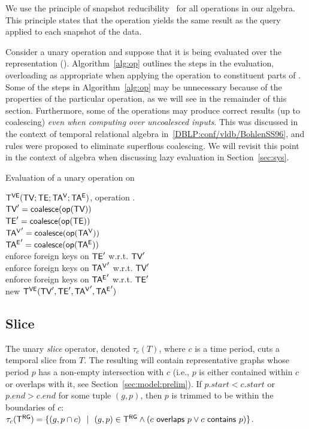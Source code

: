 We use the principle of snapshot
reducibility~\cite{DBLP:reference/db/Bohlen092} for all operations in
our algebra.  This principle states that the operation yields the same
result as the query applied to each snapshot of the data.

Consider a unary operation \op and suppose that it is being evaluated
over the \ve representation \op(\tve).  Algorithm~\ref{alg:op}
outlines the steps in the evaluation, overloading \opp as appropriate
when applying the operation to constituent parts of \tve.  Some of the
steps in Algorithm~\ref{alg:op} may be unnecessary because of the
properties of the particular operation, as we will see in the
remainder of this section.  Furthermore, some of the operations may
produce correct results (up to coalescing) {\em even when computing
  over uncoalesced inputs}.  This was discussed in the context of
temporal relational algebra in~\ref{DBLP:conf/vldb/BohlenSS96}, and
rules were proposed to eliminate superflous coalescing. We will
revisit this point in the context of \tg algebra when discussing lazy
evaluation in Section~\ref{sec:sys}.

\begin{algorithm}[h!]
\caption{Evaluation of a unary operation on \tve}
\begin{algorithmic}[1]
\REQUIRE \tg $\mathsf{T^{VE}} (\textsf{TV}; \textsf{TE}; \mathsf{TA^{V}}; \mathsf{TA^{E}})$, operation .\\
\STATE  $\textsf{TV}' = \textsf{coalesce} (\textsf{op}(\textsf{TV}))$\\
\STATE  $\textsf{TE}' = \textsf{coalesce} (\textsf{op}(\textsf{TE}))$\\
\STATE  $\mathsf{TA^{V}}' = \textsf{coalesce} (\textsf{op}(\mathsf{TA^{V}}))$\\
\STATE  $\mathsf{TA^{E}}' = \textsf{coalesce} (\textsf{op}(\mathsf{TA^{E}}))$\\
\STATE  enforce foreign keys on $\textsf{TE}'$ w.r.t. $\textsf{TV}'$\\
\STATE  enforce foreign keys on $\mathsf{TA^{V}}'$ w.r.t. $\textsf{TV}'$\\
\STATE  enforce foreign keys on $\mathsf{TA^{E}}'$ w.r.t. $\textsf{TE}'$\\
\RETURN new $\mathsf{T^{VE}} (\textsf{TV}', \textsf{TE}', \mathsf{TA^{V}}', \mathsf{TA^{E}}')$\\
\end{algorithmic}
\label{alg:op}
\end{algorithm}

\subsection{Slice}
\label{sec:algebra:slice}

The unary {\em slice} operator, denoted $\tau_c (T)$, where $c$ is a
time period, cuts a temporal slice from $T$.  The resulting \tg will
contain representative graphs whose period $p$ has a non-empty
intersection with $c$ (i.e., $p$ is either contained within $c$ or
overlaps with it, see Section~\ref{sec:model:prelim}).  If $p.start <
c.start$ or $p.end > c.end$ for some tuple $(g, p)$, then $p$ is
trimmed to be within the boundaries of $c$: $\tau_c (\mathsf{T^{RG}}) = \{ (g, p
\cap c)~~|~~(g, p) \in \mathsf{T^{RG}} \wedge (c~\mathsf{overlaps}~p \vee
c~\mathsf{contains}~p)\}$.


